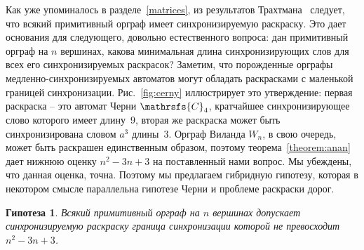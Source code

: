 \documentclass[11pt]{article}
\newcommand{\sa}{synchronizing automata}
\newcommand{\sws}{reset words}
\newtheorem{conjecture}{Гипотеза}
\begin{document}
Как уже упоминалось в разделе~\ref{matrices}, из результатов Трахтмана~\cite{Tr09} следует, что
всякий примитивный орграф имеет синхронизируемую раскраску.
Это дает основания для следующего, довольно естественного вопроса:
дан примитивный орграф на $n$ вершинах, какова минимальная длина синхронизирующих
слов для всех его синхронизируемых раскрасок?
Заметим, что порожденные орграфы медленно-синхронизируемых автоматов могут
обладать раскрасками с маленькой границей синхронизации. Рис.~\ref{fig:cerny}
иллюстрирует это утверждение: первая раскраска -- это автомат Черни $\mathrsfs{C}_4$,
кратчайшее синхронизирующее слово которого имеет длину~9, вторая же раскраска может быть
синхронизирована словом $a^3$ длины~3.
Орграф Виланда $W_n$, в свою очередь, может быть раскрашен единственным образом,
поэтому теорема~\ref{theorem:anan} дает нижнюю оценку $n^2-3n+3$ на поставленный нами вопрос.
Мы убеждены, что данная оценка, точна. Поэтому мы предлагаем гибридную гипотезу, которая в некотором
смысле параллельна гипотезе Черни и проблеме раскраски дорог.



\begin{conjecture}
\label{hybrid}
Всякий примитивный орграф на $n$ вершинах допускает синхронизируемую раскраску
граница синхронизации которой не превосходит $n^2-3n+3$.

\end{conjecture}
\end{document}
